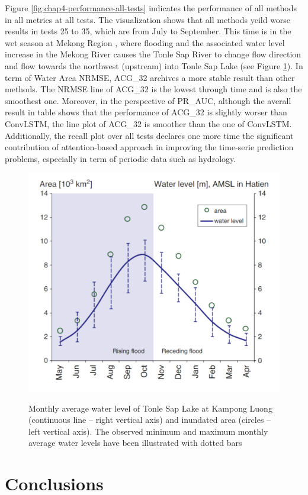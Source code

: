 Figure \ref{fig:chap4-performance-all-tests} indicates the performance of all methods in all metrics at all tests. The visualization shows that all methods yeild worse results in tests 25 to 35, which are from July to September. This time is in the wet season at Mekong Region %
, where flooding and the associated water level increase in the Mekong River causes the Tonle Sap River to change flow direction and flow towards the northwest (upstream) into Tonle Sap Lake (see Figure \ref{fig:chap4-tonlesap-avg-area}). In term of Water Area NRMSE, ACG\_32 archives a more stable result than other methods. The NRMSE line of ACG\_32 is the lowest through time and is also the smoothest one. Moreover, in the perspective of PR\_AUC, although the averall result in table shows that the performance of ACG\_32 is slightly worser than ConvLSTM, the line plot of ACG\_32 is smoother than the one of ConvLSTM. Additionally, the recall plot over all tests declares one more time the significant contribution of attention-based approach in improving the time-serie prediction problems, especially in term of periodic data such as hydrology.

\begin{figure}
    \caption[]{Monthly average water level of Tonle Sap Lake at Kampong Luong (continuous line – right vertical axis) and inundated area (circles – left vertical axis). The observed minimum and maximum monthly average water levels have been illustrated with dotted bars}
    \includegraphics[width=.65\textwidth]{figures/chap4/tonlesap_avg_area_with_floodplain.png}
    \label{fig:chap4-tonlesap-avg-area}
\end{figure}



\section{Conclusions}

